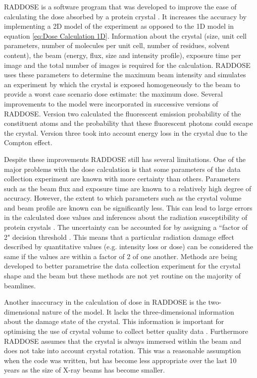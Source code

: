         RADDOSE is a software program that was developed to improve the ease of calculating the dose absorbed by a protein crystal \cite{murray2004}.
        It increases the accuracy by implementing a 2D model of the experiment as opposed to the 1D model in equation \ref{eq:Dose Calculation 1D}.
        Information about the crystal (size, unit cell parameters, number of molecules per unit cell, number of residues, solvent content), the beam (energy, flux, size and intensity profile), exposure time per image and the total number of images is required for the calculation.
        RADDOSE uses these parameters to determine the maximum beam intensity and simulates an experiment by which the crystal is exposed homogeneously to the beam to provide a worst case scenario dose estimate: the maximum dose.
        Several improvements to the model were incorporated in successive versions of RADDOSE.
        Version two \cite{pait2009} calculated the fluorescent emission probability of the constituent atoms and the probability that these fluorescent photons could escape the crystal.
        Version three \cite{pait2010} took into account energy loss in the crystal due to the Compton effect.

        Despite these improvements RADDOSE still has several limitations. One of the major problems with the dose calculation is that some parameters of the data collection experiment are known with more certainty than others.
        Parameters such as the beam flux and exposure time are known to a relatively high degree of accuracy.
        However, the extent to which parameters such as the crystal volume \cite{holton2009} and beam profile \cite{krojer2011} are known can be significantly less.
        This can lead to large errors in the calculated dose values and inferences about the radiation susceptibility of protein crystals \cite{krojer2011}.
        The uncertainty can be accounted for by assigning a ``factor of 2" decision threshold \cite{holton2009}.
		This means that a particular radiation damage effect described by quantitative values (e.g. intensity loss or dose) can be considered the same if the values are within a factor of 2 of one another.
        Methods are being developed to better parametrise the data collection experiment for the crystal shape \cite{svensson2015fully,khan2012confocal,brockhauser2008x} and the beam \cite{bowler2015massif} but these methods are not yet routine on the majority of beamlines.

        Another inaccuracy in the calculation of dose in RADDOSE is the two-dimensional nature of the model. It lacks the three-dimensional information about the damage state of the crystal.
        This information is important for optimising the use of crystal volume to collect better quality data \cite{zeldin2012,zeldin2013dwd}.
        Furthermore RADDOSE assumes that the crystal is always immersed within the beam and does not take into account crystal rotation.
        This was a reasonable assumption when the code was written, but has become less appropriate over the last 10 years as the size of X-ray beams has become smaller.


